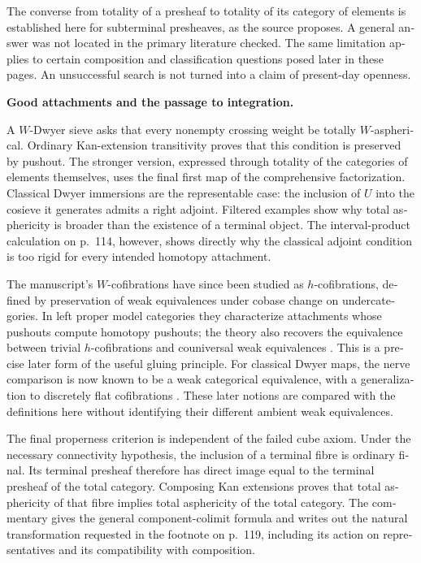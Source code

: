 \begin{otherlanguage}{english}
The converse from totality of a presheaf to totality of its category of elements is established here for subterminal presheaves, as the source proposes. A general answer was not located in the primary literature checked. The same limitation applies to certain composition and classification questions posed later in these pages. An unsuccessful search is not turned into a claim of present-day openness.

\medskip
{}
\noindent\textbf{Good attachments and the passage to integration.}

A $W$-Dwyer sieve asks that every nonempty crossing weight be totally $W$-aspherical. Ordinary Kan-extension transitivity proves that this condition is preserved by pushout. The stronger version, expressed through totality of the categories of elements themselves, uses the final first map of the comprehensive factorization. Classical Dwyer immersions are the representable case: the inclusion of $U$ into the cosieve it generates admits a right adjoint. Filtered examples show why total asphericity is broader than the existence of a terminal object. The interval-product calculation on p.~114, however, shows directly why the classical adjoint condition is too rigid for every intended homotopy attachment.

The manuscript's $W$-cofibrations have since been studied as $h$-cofibrations, defined by preservation of weak equivalences under cobase change on undercategories. In left proper model categories they characterize attachments whose pushouts compute homotopy pushouts; the theory also recovers the equivalence between trivial $h$-cofibrations and couniversal weak equivalences \citep[Proposition~1.6, Corollary~1.9 and Lemma~1.10]{BataninBerger2017}. This is a precise later form of the useful gluing principle. For classical Dwyer maps, the nerve comparison is now known to be a weak categorical equivalence, with a generalization to discretely flat cofibrations \citep[Theorems~1.5--1.6]{HackneyOzornovaRiehlRovelli2024}. These later notions are compared with the definitions here without identifying their different ambient weak equivalences.

The final properness criterion is independent of the failed cube axiom. Under the necessary connectivity hypothesis, the inclusion of a terminal fibre is ordinary final. Its terminal presheaf therefore has direct image equal to the terminal presheaf of the total category. Composing Kan extensions proves that total asphericity of that fibre implies total asphericity of the total category. The commentary gives the general component-colimit formula and writes out the natural transformation requested in the footnote on p.~119, including its action on representatives and its compatibility with composition.


\end{otherlanguage}

